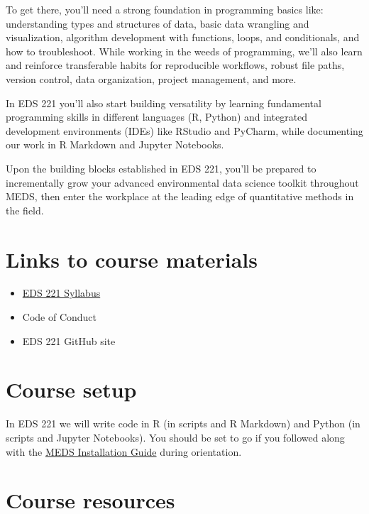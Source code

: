 \documentclass[
]{book}
\providecommand{\tightlist}{%
  \setlength{\itemsep}{0pt}\setlength{\parskip}{0pt}}
\begin{document}
To get there, you'll need a strong foundation in programming basics like: understanding types and structures of data, basic data wrangling and visualization, algorithm development with functions, loops, and conditionals, and how to troubleshoot. While working in the weeds of programming, we'll also learn and reinforce transferable habits for reproducible workflows, robust file paths, version control, data organization, project management, and more.

In EDS 221 you'll also start building versatility by learning fundamental programming skills in different languages (R, Python) and integrated development environments (IDEs) like RStudio and PyCharm, while documenting our work in R Markdown and Jupyter Notebooks.

Upon the building blocks established in EDS 221, you'll be prepared to incrementally grow your advanced environmental data science toolkit throughout MEDS, then enter the workplace at the leading edge of quantitative methods in the field.

\hypertarget{links-to-course-materials}{%
\section{Links to course materials}\label{links-to-course-materials}}

\begin{itemize}
\tightlist
\item
  \href{https://docs.google.com/document/d/1OGbc6U3STKdsThUKd9Nj5UgzeB7djgM130ku1UUH1gU/edit?usp=sharing}{EDS 221 Syllabus}
\item
  Code of Conduct
\item
  EDS 221 GitHub site
\end{itemize}

\hypertarget{course-setup}{%
\section{Course setup}\label{course-setup}}

In EDS 221 we will write code in R (in scripts and R Markdown) and Python (in scripts and Jupyter Notebooks). You should be set to go if you followed along with the \href{}{MEDS Installation Guide} during orientation.

\hypertarget{course-resources}{%
\section{Course resources}\label{course-resources}}
\end{document}
